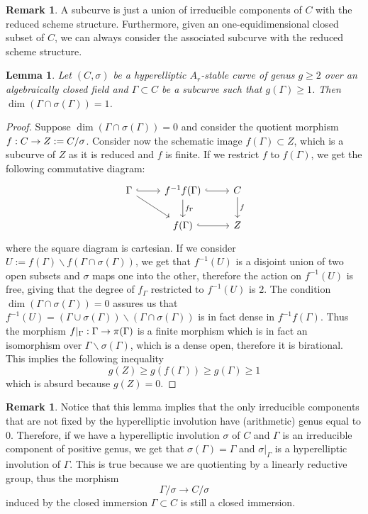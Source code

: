 \documentclass{alggeom}
\numberwithin{equation}{section}
\numberwithin{subsection}{section}
\newtheorem{lemma}[theorem]{Lemma}
\theoremstyle{definition}
\newtheorem{remark}[theorem]{Remark}
\theoremstyle{remark}
\newcommand\arr{\ifinner\to\else\longrightarrow\fi}
\renewcommand{\setminus}{\smallsetminus}
\begin{document}
\begin{remark}
	A subcurve is just a union of irreducible components of $C$ with the reduced scheme structure. Furthermore, given an one-equidimensional closed subset of $C$, we can always consider the associated subcurve with the reduced scheme structure.
\end{remark}

\begin{lemma}\label{lem:subcurve}
	 Let $(C,\sigma)$ be a hyperelliptic $A_r$-stable curve of genus $g\geq 2$ over an algebraically closed field and $\Gamma \subset C$ be a subcurve such that $g(\Gamma)\geq 1$. Then $\dim(\Gamma \cap \sigma(\Gamma))=1$.  
\end{lemma}

\begin{proof}
Suppose $\dim(\Gamma \cap \sigma(\Gamma))=0$ and consider the quotient morphism $f: C \arr Z:=C/\sigma$. Consider now the schematic image $f(\Gamma) \subset Z$, which is a subcurve of $Z$ as it is reduced and $f$ is finite. If we restrict $f$ to $f(\Gamma)$, we get the following commutative diagram:
$$
\begin{tikzcd}
\Gamma \arrow[r, hook] \arrow[rd] & f^{-1}f(\Gamma) \arrow[r, hook] \arrow[d, "f_{\Gamma}"] & C \arrow[d, "f"] \\
& f(\Gamma) \arrow[r, hook]                               & Z               
\end{tikzcd}
$$
where the square diagram is cartesian. If we consider $U:=f(\Gamma) \setminus f(\Gamma \cap \sigma(\Gamma))$, we get that $f^{-1}(U)$ is a disjoint union of two open subsets and $\sigma$ maps one into the other,  therefore the action on $f^{-1}(U)$ is free, giving that the degree of $f_{\Gamma}$ restricted to $f^{-1}(U)$ is $2$. The condition $\dim(\Gamma \cap \sigma(\Gamma))=0$ assures us that $f^{-1}(U)=(\Gamma \cup \sigma(\Gamma))\setminus (\Gamma \cap \sigma(\Gamma))$ is in fact dense in $f^{-1}f(\Gamma)$. Thus the morphism $f\vert_{\Gamma}:\Gamma \arr \pi(\Gamma)$ is a finite morphism which is in fact an isomorphism over $\Gamma\setminus \sigma(\Gamma)$, which is a dense open, therefore it is birational. This implies the following inequality
$$g(Z)\geq g(f(\Gamma))\geq g(\Gamma)\geq 1$$
which is absurd because $g(Z)=0$. 
\end{proof}

\begin{remark}
	Notice that this lemma implies that the only irreducible components that are not fixed by the hyperelliptic involution have (arithmetic) genus equal to $0$. Therefore, if we have a hyperelliptic involution $\sigma$ of $C$ and $\Gamma$ is an irreducible component of positive genus, we get that $\sigma(\Gamma)=\Gamma$ and $\sigma\vert_{\Gamma}$ is a hyperelliptic involution of $\Gamma$. This is true because we are quotienting by a linearly reductive group, thus the  morphism 
	$$\Gamma/\sigma \rightarrow C/\sigma$$
	induced by the closed immersion $\Gamma \subset C$ is still a closed immersion.
\end{remark}	
\end{document}
